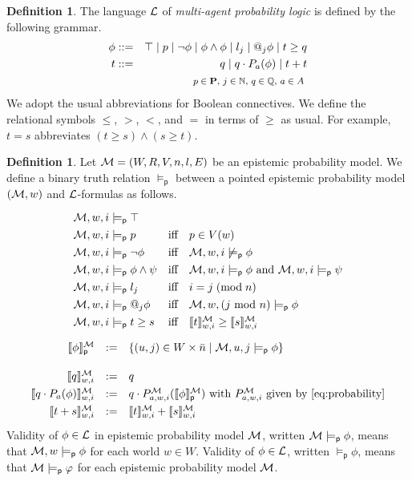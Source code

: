 \documentclass[12pt]{article}
\theoremstyle{definition}
\newtheorem{definition}[theorem]{Definition}
\newcommand{\Nat}{\mathbb{N}}  %
\newcommand{\Rat}{\mathbb{Q}}  %
\newcommand{\M}{{\cal M}}      %
\newcommand{\Prop}{{\bf P}}    %
\newcommand{\Lang}{{\cal L}}   %
\newcommand{\sem}[1]{\llbracket{#1}\rrbracket}               %
\newcommand{\modelsp}{\models_{\mathsf{p}}}                  %
\newcommand{\semp}[1]{\llbracket{#1}\rrbracket_{\mathsf{p}}} %
\begin{document}
\begin{definition}
  The language $\Lang$ of \emph{multi-agent probability logic} is
  defined by the following grammar.
  \begin{eqnarray*}
    \phi & ::= & 
    \top \mid p \mid \neg\phi \mid \phi\land\phi \mid
    l_j \mid @_j \phi \mid t\geq q
    \\
    t   & ::= & q \mid q \cdot P_a(\phi) \mid t+t
    \\
    &&
    \text{\footnotesize 
      $p\in\Prop$,
      $j\in\Nat$,
      $q\in\Rat$,
      $a\in A$
    }
  \end{eqnarray*}
  We adopt the usual abbreviations for Boolean connectives.  We define
  the relational symbols $\leq$, $>$, $<$, and $=$ in terms of $\geq$
  as usual.  For example, $t=s$ abbreviates $(t\geq s)\land(s\geq t)$.
\end{definition}

\begin{definition} 
  Let $\M=(W,R,V,n,l,E)$ be an epistemic probability model.  We define
  a binary truth relation $\modelsp$ between a pointed epistemic
  probability model $(\M,w)$ and $\Lang$-formulas as follows.
  \[
  \renewcommand{\arraystretch}{1.3}
  \begin{array}{lcl}
    \M,w,i\modelsp\top 
    \\
    \M,w,i\modelsp p & \text{iff} & 
    p \in V(w) 
    \\
    \M,w,i\modelsp\neg\phi & \text{iff} &
    \M,w,i\not\modelsp\phi
    \\
    \M,w,i\modelsp\phi\land\psi & \text{iff} &
    \M,w,i\modelsp\phi \text{ and } \M,w,i\modelsp\psi
    \\
    \M,w,i\modelsp l_j & \text{iff} & 
    i = j \;(\text{mod}\; n)
    \\
    \M,w,i\modelsp @_j \phi & \text{iff} &
    \M, w,(j \text{ mod } n)\modelsp \phi
    \\
    \M,w,i\modelsp t\geq s & \text{iff} &
    \sem{t}^{\M}_{w,i}\geq\sem{s}^{\M}_{w,i}
  \end{array}
  \]
  \[
  \renewcommand{\arraystretch}{1.3}
  \begin{array}{rcl}
    \semp{\phi}^{\M} & := &
    \{ (u,j) \in W\times\bar{n} \mid \M,u,j\modelsp\phi \}
    \\[1em]
    \sem{q}^{\M}_{w,i} & := & q
    \\
    \sem{q\cdot P_a(\phi)}^{\M}_{w,i} & := & 
    q\cdot P^{\M}_{a,w,i}(\semp{\phi}^{\M}) 
    \text{ with $P^{\M}_{a,w,i}$ given by \eqref{eq:probability}}
    \\
    \sem{t+s}^{\M}_{w,i} & := &
    \sem{t}^{\M}_{w,i} + \sem{s}^{\M}_{w,i}
  \end{array}
  \]
  Validity of $\phi\in\Lang$ in epistemic probability model $\M$,
  written $\M\modelsp\phi$, means that $\M,w\modelsp\phi$ for each
  world $w\in W$.  Validity of $\phi\in\Lang$, written $\modelsp\phi$,
  means that $\M\modelsp\varphi$ for each epistemic probability model
  $\M$.
\end{definition} 
\end{document}
